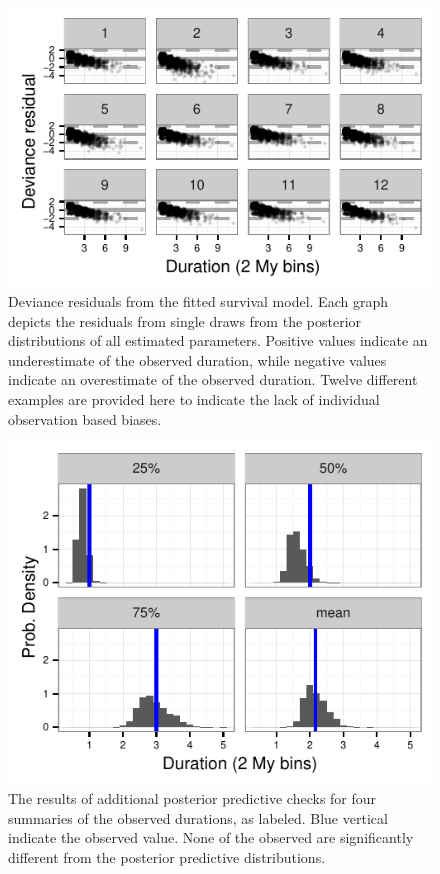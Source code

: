 \documentclass{article}
\begin{document}
\begin{figure}[ht]
  \centering
  \includegraphics[height = 0.5\textheight, width = \textwidth, keepaspectratio = true]{figure/residual_plot}
  \caption{Deviance residuals from the fitted survival model. Each graph depicts the residuals from single draws from the posterior distributions of all estimated parameters. Positive values indicate an underestimate of the observed duration, while negative values indicate an overestimate of the observed duration. Twelve different examples are provided here to indicate the lack of individual observation based biases.}
  \label{fig:ppc_res}
\end{figure}

\begin{figure}[ht]
  \centering
  \includegraphics[height = 0.5\textheight, width = \textwidth, keepaspectratio = true]{figure/quant_ppc}
  \caption{The results of additional posterior predictive checks for four summaries of the observed durations, as labeled. Blue vertical indicate the observed value. None of the observed are significantly different from the posterior predictive distributions.}
  \label{fig:ppc_quant}
\end{figure}
\end{document}
